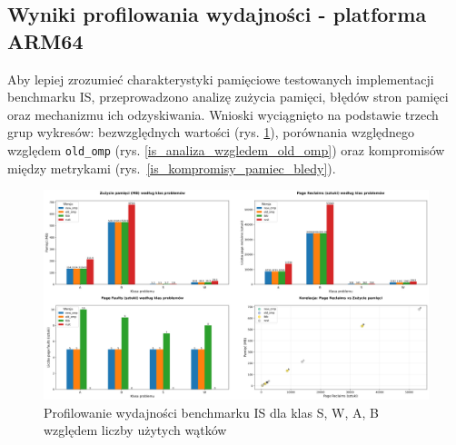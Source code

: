 \subsection{Wyniki profilowania wydajności - platforma ARM64}
Aby lepiej zrozumieć charakterystyki pamięciowe testowanych implementacji benchmarku IS, przeprowadzono analizę zużycia pamięci, błędów stron pamięci oraz mechanizmu ich odzyskiwania. Wnioski wyciągnięto na podstawie trzech grup wykresów: bezwzględnych wartości (rys. \ref{is_porownanie_zuzycia_pamieci}), porównania względnego względem \texttt{old\_omp} (rys. \ref{is_analiza_wzgledem_old_omp}) oraz kompromisów między metrykami \mbox{(rys. \ref{is_kompromisy_pamiec_bledy})}.
\begin{figure}[H]
    \centering
    \includegraphics[width=\textwidth]{analiza/images/parallel/is/arm/chart_01_memory_comparison.png}
    \caption{Profilowanie wydajności benchmarku IS dla klas S, W, A, B względem liczby użytych wątków}
    \label{is_porownanie_zuzycia_pamieci}
\end{figure}
